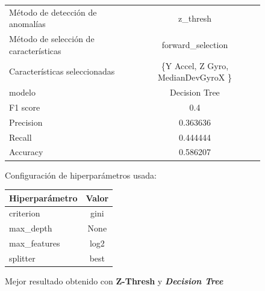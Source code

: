 \begin{appendices}
		\begin{figure}[htb]
			\centering
			\caption{Mejor resultado obtenido con \textbf{Z-Thresh} y \textbf{\emph{Decision Tree}}}
			\label{table:21}
			\begin{tabular}{lc}
				\toprule
				\midrule
					  Método de detección de anomalías &                          z\_thresh \\
				Método de selección de características &                 forward\_selection \\
						 Características seleccionadas & \{Y Accel, Z Gyro, MedianDevGyroX \} \\
												modelo &                     Decision Tree \\
											  F1 score &                               0.4 \\
											 Precision &                          0.363636 \\
												Recall &                          0.444444 \\
											  Accuracy &                          0.586207 \\
				\bottomrule
				\end{tabular}
			\newline
			\newline
			Configuración de hiperparámetros usada:
			\begin{tabular}{lc}
				\toprule
				Hiperparámetro & Valor \\
				\midrule
					 criterion &  gini \\
					 max\_depth &  None \\
				  max\_features &  log2 \\
					  splitter &  best \\
				\bottomrule
			\end{tabular}
			
		\end{figure}


\end{appendices}
